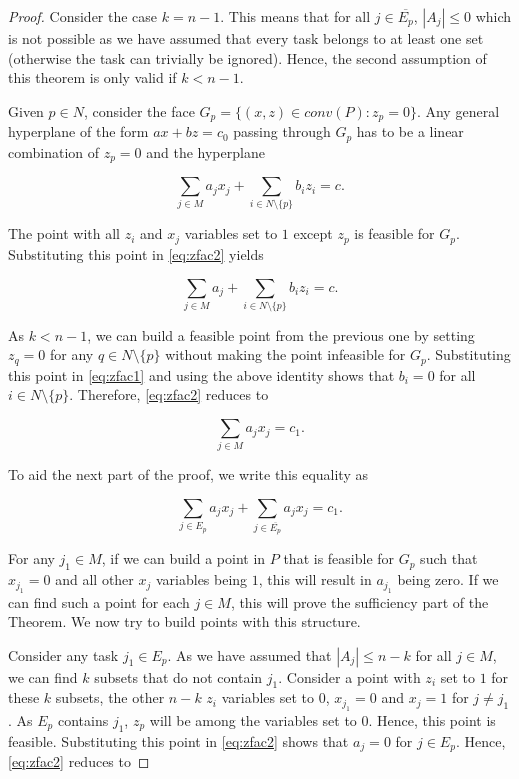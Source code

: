 \documentclass[12pt]{article}
\renewcommand{\v}[1]{\overline{#1}}
\begin{document}
\begin{proof}
Consider the case $k = n-1$. This means that for all $j \in \v{E_p}$, $|A_j| \leq 0$ which is not possible as we have assumed that every task belongs to at least one set (otherwise the task can trivially be ignored). Hence, the second assumption of this theorem is only valid if $k < n-1$.

Given $p \in N$, consider the face $G_p = \{(x,z) \in conv(P) : z_p = 0\}$. Any general hyperplane of the form $ax + bz = c_0$ passing through $G_p$ has to be a linear combination of $z_p = 0$ and the hyperplane

\begin{equation} \label{eq:zfac1}
\sum_{j \in M} a_j x_j + \sum_{i \in N \setminus \{p\}} b_i z_i = c.
\end{equation}

The point with all $z_i$ and $x_j$ variables set to $1$ except $z_p$ is feasible for $G_p$. Substituting this point in \eqref{eq:zfac2} yields

\[ \sum_{j \in M} a_j + \sum_{i \in N \setminus \{p\}} b_i z_i = c.\]

As $k < n-1$, we can build a feasible point from the previous one by setting $z_q = 0$ for any $q \in N \setminus \{p\}$ without making the point infeasible for $G_p$. Substituting this point in \eqref{eq:zfac1} and using the above identity shows that $b_i = 0$ for all $i \in N \setminus \{p\}$. Therefore, \eqref{eq:zfac2} reduces to

\[\sum_{j \in M} a_j x_j = c_1. \]

To aid the next part of the proof, we write this equality as

\begin{equation} \label{eq:zfac2}
\sum_{j \in E_p} a_j x_j + \sum_{j \in \v{E_p}} a_j x_j = c_1.
\end{equation}

For any $j_1 \in M$, if we can build a point in $P$ that is feasible for $G_p$ such that $x_{j_1} = 0$ and all other $x_j$ variables being $1$, this will result in $a_{j_1}$ being zero. If we can find such a point for each $j \in M$, this will prove the sufficiency part of the Theorem. We now try to build points with this structure.

Consider any task $j_1 \in E_p$. As we have assumed that $|A_j| \leq n-k$ for all $j \in M$, we can find $k$ subsets that do not contain $j_1$. Consider a point with $z_i$ set to $1$ for these $k$ subsets, the other $n-k$ $z_i$ variables set to $0$, $x_{j_1} = 0$ and $x_j = 1$ for $j \neq j_1$. As $E_p$ contains $j_1$, $z_p$ will be among the variables set to $0$. Hence, this point is feasible. Substituting this point in \eqref{eq:zfac2} shows that $a_j = 0$ for $j \in E_p$. Hence, \eqref{eq:zfac2} reduces to


\end{proof}
\end{document}
